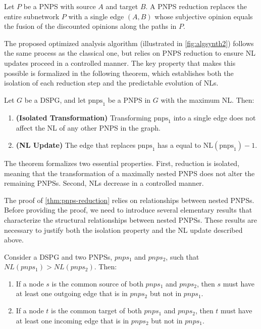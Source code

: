 \begin{definition}
Let $P$ be a  \ac{PNPS} with source $A$ and target $B$. A  \ac{PNPS} reduction replaces the entire subnetwork $P$ with a single edge $(A,B)$ whose subjective opinion equals the fusion of the discounted opinions along the paths in \(P\).
\end{definition}

The proposed optimized analysis algorithm (illustrated in \cref{fig:algsynth2}) follows the same process as the classical one, but relies on PNPS reduction to ensure NL updates proceed in a controlled manner. The key property that makes this possible is formalized in the following theorem, which establishes both the isolation of each reduction step and the predictable evolution of \acp{NL}.

\begin{theorem}
\label{thm:pnps-reduction}
Let $G$ be a \ac{DSPG}, and let $\text{pnps}_1$ be a \ac{PNPS} in $G$ with the maximum \ac{NL}. Then:
\begin{enumerate}
    \item \textbf{(Isolated Transformation)} Transforming $\text{pnps}_1$ into a single edge does not affect the \ac{NL} of any other PNPS in the graph.
    \item \textbf{(\ac{NL} Update)} The edge that replaces $\text{pnps}_1$ has a  equal to $\text{NL}(\text{pnps}_1) - 1$.
\end{enumerate}
\end{theorem}
The theorem formalizes two essential properties. First, reduction is isolated, meaning that the transformation of a maximally nested \ac{PNPS} does not alter the remaining \acp{PNPS}. Second, \acp{NL} decrease in a controlled manner.

The proof of \cref{thm:pnps-reduction} relies on relationships between nested \acp{PNPS}. Before providing the proof, we need to introduce several elementary results that characterize the structural relationships between nested PNPSs. These results are necessary to justify both the isolation property and the \ac{NL} update described above.
\begin{theorem}
\label{thrm:anlsys}
Consider a \ac{DSPG} and two PNPSs, $pnps_1$ and $pnps_2$, such that $NL(pnps_1) > NL(pnps_2)$. Then:
\begin{enumerate}
    \item \label{thm:p1} If a node $s$ is the common source of both $pnps_1$ and $pnps_2$, then $s$ must have at least one outgoing edge that is in $pnps_2$ but not in $pnps_1$.
    \item \label{thm:p2} If a node $t$ is the common target of both $pnps_1$ and $pnps_2$, then $t$ must have at least one incoming edge that is in $pnps_2$ but not in $pnps_1$.
\end{enumerate}
\end{theorem}

